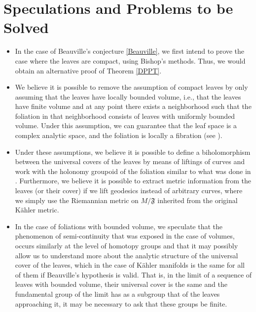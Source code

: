 \documentclass[12pt,twoside,a4paper]{report}
\begin{document}
\section{Speculations and Problems to be Solved}
\begin{itemize}
        \item In the case of Beauville's conjecture \ref{Beauville}, we first intend to prove the case where
        the leaves are compact, using Bishop's methods. Thus, we would obtain an alternative proof of
        Theorem \ref{DPPT}.

        \item We believe it is possible to remove the assumption of compact leaves by only assuming that the
        leaves have locally bounded volume, i.e., that the leaves have finite volume and at any point there exists
        a neighborhood such that the foliation in that neighborhood consists of leaves with uniformly bounded volume. Under this
        assumption, we can guarantee that the leaf space is a complex analytic space, and the foliation is
        locally a fibration (see \cite{A-V}).

        \item Under these assumptions, we believe it is possible to define a biholomorphism between the universal covers
        of the leaves by means of liftings of curves and work with the holonomy groupoid of the foliation
        similar to what was done in \cite{DPPT}. Furthermore, we believe it is possible to extract metric information from the
        leaves (or their cover) if we lift geodesics instead of arbitrary curves, where we simply use the
        Riemannian metric on $M/\mathfrak{F}$ inherited from the original Kähler metric.

        \item In the case of foliations with bounded volume, we speculate that the phenomenon of semi-continuity that was exposed in the case
        of volumes, occurs similarly at the level of homotopy groups and that it may possibly allow us to understand more about the
        analytic structure of the universal cover of the leaves, which in the case of Kähler manifolds is the same for all of them
        if Beauville's hypothesis is valid. That is, in the limit of a sequence of leaves with bounded volume, their universal
        cover is the same and the fundamental group of the limit has as a subgroup that of the leaves approaching it,
        it may be necessary to ask that these groups be finite.


\end{itemize}
\end{document}
